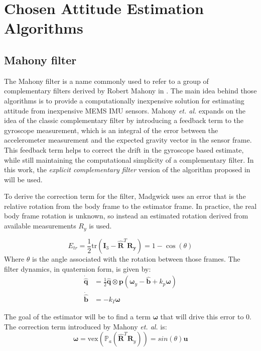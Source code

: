 \chapter{Chosen Attitude Estimation Algorithms}

\section{Mahony filter}

The Mahony filter is a name commonly used to refer to a group of complementary filters derived by Robert Mahony in \cite{mahony-comp-so3}. The main idea behind those algorithms is to provide a computationally inexpensive solution for estimating attitude from inexpensive MEMS IMU sensors. Mahony \textit{et. al.} expands on the idea of the classic complementary filter by introducing a feedback term to the gyroscope measurement, which is an integral of the error between the accelerometer measurement and the expected gravity vector in the sensor frame. This feedback term helps to correct the drift in the gyroscope based estimate, while still maintaining the computational simplicity of a complementary filter.
In this work, the \textit{explicit complementary filter} version of the algorithm proposed in \cite{mahony-comp-so3} will be used.

To derive the correction term for the filter, Madgwick uses an error that is the relative rotation from the body frame to the estimator frame. In practice, the real body frame rotation is unknown, so instead an estimated rotation derived from available measurements $R_{y}$ is used.

\begin{equation}
	E_{tr} = \frac{1}{2} \text{tr}(\boldsymbol{I}_3 - \hat{\boldsymbol{R}}^T\boldsymbol{R_y}) = 1 - \cos(\theta)
\end{equation}
Where $\theta$ is the angle associated with the rotation between those frames.
The filter dynamics, in quaternion form, is given by:
\begin{equation}
	\begin{aligned}
		\dot{{\hat{\boldsymbol{q}}}} & = \frac{1}{2} \boldsymbol{\hat{q}} \otimes \boldsymbol{p}(\boldsymbol{\omega}_y - \hat{\boldsymbol{b}} + k_p \boldsymbol{\omega}) \\
		\boldsymbol{\dot{\hat{b}}} & = -k_I \boldsymbol{\omega}
	\end{aligned}
\end{equation}

The goal of the estimator will be to find a term $\boldsymbol{\omega}$ that will drive this error to 0. The correction term introduced by Mahony \textit{et. al.} is:
\begin{equation}
	\boldsymbol{\omega} = \text{vex}(\mathbb{P}_a(\hat{\mathbf{R}}^T\mathbf{R}_y)) = sin(\theta)\mathbf{u}
\end{equation}

